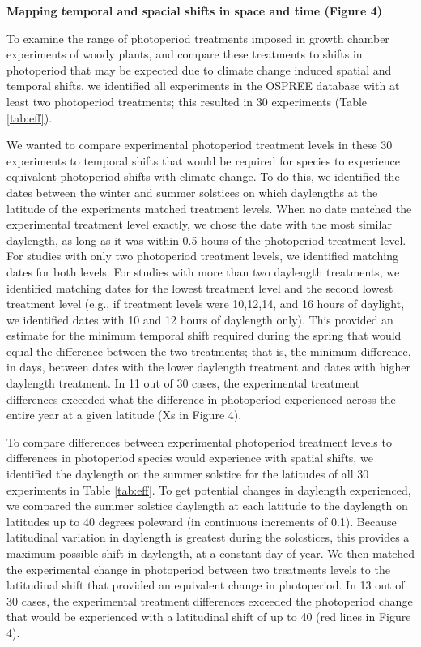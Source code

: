 \documentclass{article}
\begin{document}
\par \textbf{Mapping temporal and spacial shifts in space and time (Figure 4)}
\par To examine the range of photoperiod treatments imposed in growth chamber experiments of woody plants, and compare these treatments to shifts in photoperiod that may be expected due to climate change induced spatial and temporal shifts, we identified all experiments in the OSPREE database with at least two photoperiod treatments; this resulted in 30 experiments (Table \ref{tab:eff}). 
\par We wanted to compare experimental photoperiod treatment levels in these 30 experiments to temporal shifts that would be required for species to experience equivalent photoperiod shifts with climate change. To do this, we identified the dates between the winter and summer solstices on which daylengths at the latitude of the experiments matched treatment levels. When no date matched the experimental treatment level exactly, we chose the date with the most similar daylength, as long as it was within 0.5 hours of the photoperiod treatment level. For studies with only two photoperiod treatment levels, we identified matching dates for both levels. For studies with more than two daylength treatments, we identified matching dates for the lowest treatment level and the second lowest treatment level (e.g., if treatment levels were 10,12,14, and 16 hours of daylight, we identified dates with 10 and 12 hours of daylength only). This provided an estimate for the minimum temporal shift required during the spring that would equal the difference between the two treatments; that is, the minimum difference, in days, between dates with the lower daylength treatment and dates with higher daylength treatment.
In 11 out of 30 cases, the experimental treatment differences exceeded what the difference in photoperiod experienced across the entire year at a given latitude (Xs in Figure 4). 

\par To compare differences between experimental photoperiod treatment levels to differences in photoperiod species would experience with spatial shifts, we identified the daylength on the summer solstice for the latitudes of all 30 experiments in Table \ref{tab:eff}. To get potential changes in daylength experienced, we compared the summer solstice daylength at each latitude to the daylength on latitudes up to 40 degrees poleward (in continuous increments of 0.1\degree). Because latitudinal variation in daylength is greatest during the solcstices, this provides a maximum possible shift in daylength, at a constant day of year. We then matched the experimental change in photoperiod between two treatments levels to the latitudinal shift that provided an equivalent change in photoperiod. In 13 out of 30 cases, the experimental treatment differences exceeded the photoperiod change that would be experienced with a latitudinal shift of up to 40 \degree (red lines in Figure 4). 
\end{document}
